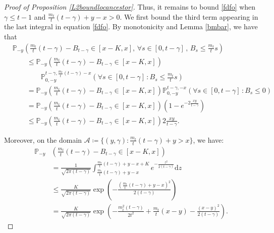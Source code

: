 \documentclass[10pt,a4paper]{amsart}
\newcommand{\Prob}{\mathbb{P}}
\begin{document}
\begin{proof}[Proof of Proposition \ref{L2boundlocancestor}]
Thus, it remains to bound \eqref{fdfo} when $\gamma \leq t-1$ and $\frac{m_t}{t}(t-\gamma) +y -x > 0$.
We first bound the third term appearing in the last integral in equation \eqref{fdfo}. By monotonicity and Lemma \ref{bmbar}, we have that
\begin{equation}
    \begin{split}
         &\Prob_{-y}\left(  \frac{m_t}{t}(t- \gamma) - B_{t- \gamma} \in [x-K,x] , \, \forall s \in [0,t-\gamma] \, , \, B_{s} \leq \frac{m_t}{t}s \right)
         \\& \qquad \leq \Prob_{-y}\left(  \frac{m_t}{t}(t- \gamma) - B_{t- \gamma} \in [x-K,x] \right) 
         \\&  \qquad \qquad \Prob_{0,-y}^{t-\gamma,\frac{m_t}{t}(t- \gamma)-x }\left(\forall s \in [0,t-\gamma] \, : B_{s} \leq \frac{m_t}{t}s \right)
         \\&  \qquad =\Prob_{-y}\left(  \frac{m_t}{t}(t- \gamma) - B_{t- \gamma} \in [x-K,x] \right) \Prob_{0,-y}^{t-\gamma,-x }\left(\forall s \in [0,t-\gamma] \, : B_{s} \leq 0\right)
        \\&  \qquad = \Prob_{-y}\left(  \frac{m_t}{t}(t- \gamma) - B_{t- \gamma} \in [x-K,x]\right) \left(1- e^{-2\frac{xy}{t- \gamma}}\right)
        \\& \qquad \leq \Prob_{-y}\left( \frac{m_t}{t}(t- \gamma) - B_{t- \gamma} \in [x-K,x] \right)2\frac{xy}{t- \gamma}.
    \end{split}
\end{equation}

Moreover, on the domain $\mathcal{A} \coloneqq \{(y,\gamma) : \frac{m_t}{t}(t-\gamma) + y > x\}$, we have:
\begin{equation}
    \begin{aligned}
        \Prob_{-y}&\left(\tfrac{m_t}{t}(t-\gamma) - B_{t-\gamma} \in [x-K,x]\right) \\
        &= \frac{1}{\sqrt{2\pi(t-\gamma)}} \int_{\frac{m_t}{t}(t-\gamma) + y - x}^{\frac{m_t}{t}(t-\gamma) + y - x + K} 
            e^{-\frac{z^2}{2(t-\gamma)}} \mathrm{d}z \\
        &\leq \frac{K}{\sqrt{2\pi(t-\gamma)}} \exp\left(-\frac{\left(\tfrac{m_t}{t}(t-\gamma) + y - x\right)^2}{2(t-\gamma)}\right) \\
        &= \frac{K}{\sqrt{2\pi(t-\gamma)}} \exp\left(
            -\tfrac{m_t^2(t-\gamma)}{2t^2} + \tfrac{m_t}{t}(x-y) - \tfrac{(x-y)^2}{2(t-\gamma)}
        \right).
    \end{aligned}
\end{equation}


\end{proof}
\end{document}
